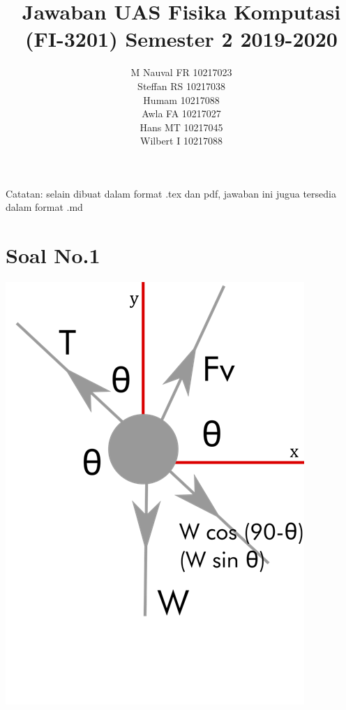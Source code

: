 \documentclass[12pt]{article}
\title{Jawaban UAS Fisika Komputasi (FI-3201) Semester 2 2019-2020}
\author{M Nauval FR 10217023\\
	Steffan RS 10217038\\
	Humam 10217088\\
	Awla FA 10217027\\
	Hans MT 10217045\\
	Wilbert I 10217088\\}
\begin{document}
	\maketitle
	Catatan: selain dibuat dalam format .tex dan pdf, jawaban ini jugua tersedia dalam format .md
\section{Soal No.1}
	\includegraphics[scale=0.4]{UASFiskom0101.png}\\
\end{document}
